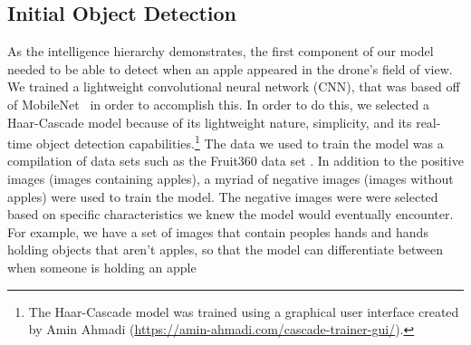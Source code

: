 \subsection{Initial Object Detection}
As the intelligence hierarchy demonstrates, the first component of our model needed to be able to detect when an apple appeared in the drone's field of view. 
We trained a lightweight convolutional neural network (CNN), that was based off of MobileNet~\cite{Sandler2018,PyTorchMobileNet} in order to accomplish this. 
In order to do this, we selected a Haar-Cascade model because of its lightweight nature, simplicity, and its real-time object detection capabilities.\footnote{The Haar-Cascade model was trained using a graphical user interface created by Amin Ahmadi (\url{https://amin-ahmadi.com/cascade-trainer-gui/}).} 
The data we used to train the model was a compilation of data sets such as the Fruit360 data set \cite{Fruit360}.
In addition to the positive images (images containing apples), a myriad of negative images (images without apples) were used to train the model.
The negative images were were selected based on specific characteristics we knew the model would eventually encounter. 
For example, we have a set of images that contain peoples hands and hands holding objects that aren't apples, so that the model can differentiate between when someone is holding an apple 